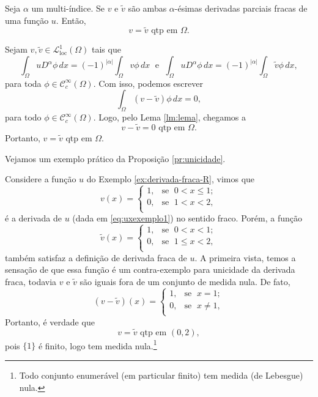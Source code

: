 \documentclass[a4paper, 11pt]{book}
\theoremstyle{definition}
\newcommand{\cC}{\mathcal{C}}
\newcommand{\cL}{\mathcal{L}}
\begin{document}
\begin{pbox} \label{pr:unicidade}
    Seja $\alpha$ um multi-índice. Se $v$ e $\tilde v$ são ambas $\alpha$-ésimas derivadas parciais fracas de uma função $u$.
    Então,
    \[
        v = \tilde v \text{ qtp em } \Omega.
    \]
\end{pbox}
\begin{prf}
    Sejam $v, \tilde v \in \cL^1_{\mathrm{loc}}(\Omega)$ tais que
    \[
        \int_\Omega u D^\alpha \phi \,dx = (-1)^{|\alpha|} \int_\Omega v \phi \,dx \;\text{ e }\; \int_\Omega u D^\alpha \phi \, dx= (-1)^{|\alpha|}\int_\Omega \tilde v \phi \,dx,
    \]
    para toda $\phi \in \cC^\infty_c(\Omega)$. Com isso, podemos escrever
    \[
        \int_\Omega (v - \tilde v) \phi \, dx = 0,
    \]
    para todo $\phi \in \cC^{\infty}_c(\Omega)$.
    Logo, pelo Lema \ref{lm:lema}, chegamos a
    \[
        v - \tilde v = 0 \text{ qtp em } \Omega.
    \]
    Portanto, $v = \tilde v$ qtp em $\Omega$.
\end{prf}

Vejamos um exemplo prático da Proposição \ref{pr:unicidade}.

\begin{ex}
    Considere a função $u$ do Exemplo \ref{ex:derivada-fraca-R}, vimos que
    \[
        v(x) = \left\{
            \begin{array}{rl}
                1, & \!\text{se }\; 0 < x \leqslant 1;\\
                0, & \!\text{se }\; 1 < x < 2,\\
            \end{array}
        \right.
    \]
    é a derivada de $u$ (dada em \ref{eq:uxexemplo1}) no sentido fraco.
    Porém, a função
    \[
        \tilde v(x) = \left\{
            \begin{array}{rl}
                1, & \text{se }\; 0 < x < 1;\\
                0, & \text{se }\; 1 \leqslant x < 2,\\
            \end{array}
        \right.
    \]
    também satisfaz a definição de derivada fraca de $u$.
    A primeira vista, temos a sensação de que essa função é um contra-exemplo para unicidade da derivada fraca, todavia $v$ e $\tilde v$ são iguais fora de um conjunto de medida nula.
    De fato,
    \[
        (v - \tilde v)(x) = \left\{
            \begin{array}{rl}
                1, & \text{se }\; x = 1;\\
                0, & \text{se }\; x \neq 1,\\
            \end{array}
        \right.
    \]
    Portanto, é verdade que
    \[
        v = \tilde v \text{ qtp em } (0,2),
    \]
    pois $\{1\}$ é finito, logo tem medida nula.\footnote{Todo conjunto enumerável (em particular finito) tem medida (de Lebesgue) nula.}
\end{ex}
\end{document}
